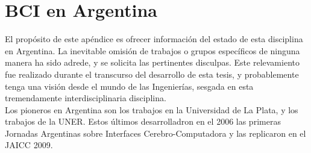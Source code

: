 \chapter{BCI en Argentina}
\label{chapter:ten}

El propósito de este apéndice es ofrecer información del estado de esta disciplina en Argentina.  La inevitable omisión de trabajos o grupos específicos de ninguna manera ha sido adrede, y se solicita las pertinentes disculpas.  Este relevamiento fue realizado durante el transcurso del desarrollo de esta tesis, y probablemente tenga una visión desde el mundo de las Ingenierías, sesgada en esta tremendamente interdisciplinaria disciplina. \\

Los pioneros en Argentina son los trabajos en la Universidad de La Plata, y los trabajos de la UNER.  Estos últimos desarrolladron en el 2006 las primeras Jornadas Argentinas sobre Interfaces Cerebro-Computadora y las replicaron en el JAICC 2009. \\

